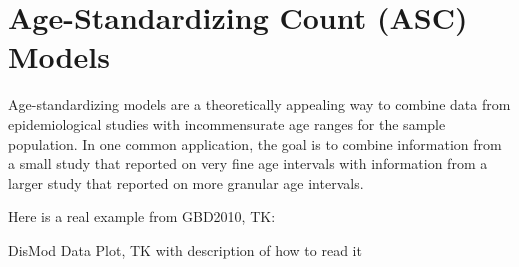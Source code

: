 \section{Age-Standardizing Count (ASC) Models}

Age-standardizing models are a theoretically appealing way to combine
data from epidemiological studies with incommensurate age ranges for
the sample population. In one common application, the goal is to
combine information from a small study that reported on very fine age
intervals with information from a larger study that reported on more
granular age intervals.

Here is a real example from GBD2010, TK:

DisMod Data Plot, TK with description of how to read it
